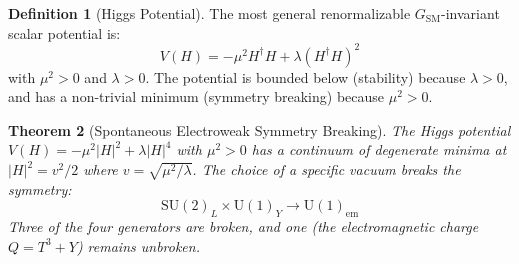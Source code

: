 \documentclass[12pt]{article}
\newtheorem{theorem}{Theorem}[section]
\theoremstyle{definition}
\newtheorem{definition}[theorem]{Definition}
\theoremstyle{remark}
\begin{document}
\begin{definition}[Higgs Potential]
\label{def:higgspotential}
The most general renormalizable $G_{\mathrm{SM}}$-invariant scalar potential is:
\begin{equation}
\label{eq:higgspotential}
V(H) = -\mu^2 H^\dagger H + \lambda (H^\dagger H)^2
\end{equation}
with $\mu^2 > 0$ and $\lambda > 0$. The potential is bounded below (stability) because $\lambda > 0$, and has a non-trivial minimum (symmetry breaking) because $\mu^2 > 0$.
\end{definition}

\begin{theorem}[Spontaneous Electroweak Symmetry Breaking]
\label{thm:ewsb}
The Higgs potential $V(H) = -\mu^2 |H|^2 + \lambda |H|^4$ with $\mu^2 > 0$ has a continuum of degenerate minima at $|H|^2 = v^2/2$ where $v = \sqrt{\mu^2/\lambda}$. The choice of a specific vacuum breaks the symmetry:
\begin{equation}
\mathrm{SU}(2)_L \times \mathrm{U}(1)_Y \longrightarrow \mathrm{U}(1)_{\mathrm{em}}
\end{equation}
Three of the four generators are broken, and one (the electromagnetic charge $Q = T^3 + Y$) remains unbroken.
\end{theorem}
\end{document}
